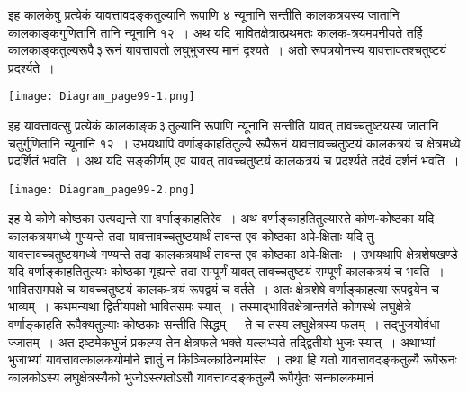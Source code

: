 \documentclass[11pt, openany]{book}
\begin{document}
\newpage

\begin{sloppypar}
इह कालकेषु प्रत्येकं यावत्तावदङ्कतुल्यानि रूपाणि ४ न्यूनानि सन्तीति कालकत्रयस्य जातानि कालकाङ्कगुणितानि तानि न्यूनानि १२~। अथ यदि भावितक्षेत्रात्प्रथमतः कालक-त्रयमपनीयते तर्हि कालकाङ्कतुल्यरूपै\textendash \,३\textendash \,रूनं यावत्तावतो लघुभुजस्य मानं दृश्यते~। अतो रूपत्रयोनस्य यावत्तावतश्चतुष्टयं प्रदर्श्यते~।

\begin{center}
\texttt{[image: Diagram\_page99-1.png]}
\end{center}

इह यावत्तावत्सु प्रत्येकं कालकाङ्क\textendash \,३\textendash \,तुल्यानि रूपाणि न्यूनानि सन्तीति यावत् तावच्चतुष्टयस्य जातानि चतुर्गुणितानि न्यूनानि १२~। उभयथापि वर्णाङ्काहतितुल्यै रूपैरूनं यावत्तावच्चतुष्टयं कालकत्रयं च क्षेत्रमध्ये प्रदर्शितं भवति~। अथ यदि सङ्कीर्णम् एव यावत् तावच्चतुष्टयं कालकत्रयं च प्रदर्श्यते तदैवं दर्शनं भवति~।

\begin{center}
\texttt{[image: Diagram\_page99-2.png]}
\end{center}

इह ये कोणे कोष्ठका उत्पद्यन्ते सा वर्णाङ्काहतिरेव~। अथ वर्णाङ्काहतितुल्यास्ते कोण-कोष्ठका यदि कालकत्रयमध्ये गुण्यन्ते तदा यावत्तावच्चतुष्टयार्थं तावन्त एव कोष्ठका अपे-क्षिताः यदि तु यावत्तावच्चतुष्टयमध्ये गण्यन्ते तदा कालकत्रयार्थं तावन्त एव कोष्ठका अपे-क्षिताः~। उभयथापि क्षेत्रशेषखण्डे यदि वर्णाङ्काहतितुल्याः कोष्ठका गृह्यन्ते तदा सम्पूर्णं यावत् तावच्चतुष्टयं सम्पूर्णं कालकत्रयं च भवति~। भावितसमपक्षे च यावच्चतुष्टयं कालक-त्रयं रूपद्वयं च वर्तते~। अतः क्षेत्रशेषे वर्णाङ्काहत्या रूपद्वयेन च भाव्यम्~। कथमन्यथा द्वितीयपक्षो भावितसमः स्यात्~। तस्माद्भावितक्षेत्रान्तर्गते कोणस्थे लघुक्षेत्रे वर्णाङ्काहति-रूपैक्यतुल्याः कोष्ठकाः सन्तीति सिद्धम्~। ते च तस्य लघुक्षेत्रस्य फलम्~। तद्भुजयोर्वधा-ज्जातम्~। अत इष्टमेकभुजं प्रकल्प्य तेन क्षेत्रफले भक्ते यल्लभ्यते तद्द्वितीयो भुजः स्यात्~। अथाभ्यां भुजाभ्यां यावत्तावत्कालकयोर्माने ज्ञातुं न किञ्चित्काठिन्यमस्ति~। तथा हि यतो यावत्तावदङ्कतुल्यै रूपैरूनः कालकोऽस्य लघुक्षेत्रस्यैको भुजोऽस्त्यतोऽसौ यावत्तावदङ्कतुल्यै रूपैर्युतः सन्कालकमानं
\end{sloppypar}

\newpage
\end{document}
